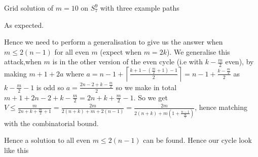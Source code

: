 \documentclass[a4paper,10pt]{article}
\newcommand{\ceil}[1]{\left \lceil #1 \right \rceil}
\theoremstyle{definition}
\theoremstyle{definition}
\theoremstyle{remark}
\theoremstyle{definition}
\begin{document}
\begin{myfigure}
{
}
\caption{Grid solution of $m=10$ on $S_{7}^{9}$ with three example paths}
\end{myfigure}

As expected.

Hence we need to perform a generalisation to give us the answer when $m \leq 2(n-1)$ for all even $m$ (expect when $m=2k$). 
We generalise this attack,when $m$ is in the other version of the even cycle (i.e with $k-\frac{m}{2}$ even), by making $m+1+2a$ where $a=n-1+\ceil{\frac{k+1-(\frac{m}{2}+1)-1}{2}}=n-1+\frac{k-\frac{m}{2}}{2}$ as $k-\frac{m}{2}-1$ is odd so  $a=\frac{2n-2+k-\frac{m}{2}}{2}$ so we make in total $m+1+2n-2+k-\frac{m}{2}=2n+k+\frac{m}{2}-1$. So we get $V \leq \frac{m}{2n+k+\frac{m}{2}+1}=\frac{2m}{2(n+k)+m+2(n-1)}=\frac{2m}{2(n+k)+m(1+\frac{n-1}{\frac{m}{2}})}$, hence matching with the combinatorial bound.

Hence a solution to all even $m \leq 2(n-1)$ can be found. Hence our cycle look like this
\end{document}
